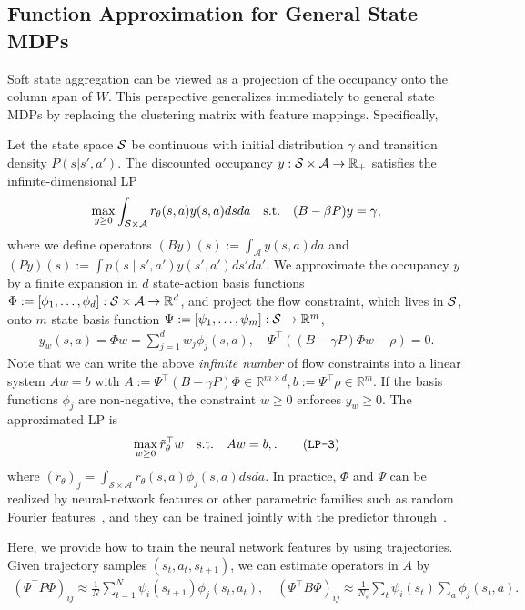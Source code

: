 \subsection{Function Approximation for General State MDPs}
Soft state aggregation can be viewed as a projection of the occupancy \LP onto the column span of $W$. This perspective generalizes immediately to general state MDPs by replacing the clustering matrix with feature mappings. Specifically, 

Let the state space ${\mathcal{S}}$ be continuous with initial distribution $\gamma$ and transition density $P(s | s', a')$. The discounted occupancy $y : {\mathcal{S}} \times {\mathcal{A}} \to \mathbb{R}_{+}$ satisfies the infinite-dimensional LP
\begin{align*}
    \max_{y \geq 0} \int_{{\mathcal{S}} \times {\mathcal{A}}} r_\theta(s, a) y(s, a) dsda
    \quad\text{s.t.}\quad
    (B - \beta P)y = \gamma, 
\end{align*}
where we define operators $(B y)(s) := \int_{\mathcal{A}} y(s, a) da$ and $(P y)(s) := \int p(s \mid s', a') y(s', a') ds' da'$. We approximate the occupancy $y$ by a finite expansion in $d$ state-action basis functions $\Phi := [\phi_1, \dots, \phi_d]: {\mathcal{S}} \times {\mathcal{A}} \to \mathbb{R}^d$, and project the flow constraint, which lives in ${\mathcal{S}}$, onto $m$ state basis function $\Psi := [\psi_1, \dots, \psi_m] : {\mathcal{S}} \to \mathbb{R}^m$,
\begin{align*}
    y_w(s,a) = \Phi w =  \sum_{j=1}^d w_j \phi_j(s,a), \quad \Psi^\top ((B - \gamma P)\Phi w - \rho) = 0.
\end{align*}
Note that we can write the above \emph{infinite number} of flow constraints into a linear system $Aw = b$ with
$A := \Psi^\top (B - \gamma P)\Phi \in \mathbb{R}^{m \times d},
b := \Psi^\top \rho \in \mathbb{R}^{m}$.
If the basis functions $\phi_j$ are non-negative, the constraint $w \geq 0$ enforces $y_w \geq 0$. The approximated LP is
\begin{align}
    \max_{w \geq 0}  \tilde{r}_\theta^\top w
    \quad\text{s.t.}\quad
    A w = b, .\tag{\texttt{LP-3}}
    \label{eq:projected_lp}
\end{align}
where $(\tilde{r}_\theta)_j = \int_{\mathcal{S}\times\mathcal{A}} r_\theta(s, a) \phi_j(s, a) ds da$. In practice, $\Phi$ and $\Psi$ can be realized by neural-network features or other parametric families such as random Fourier features~\cite{}, and they can be trained jointly with the predictor through~.

Here, we provide how to train the neural network features by using trajectories. Given trajectory samples $(s_t, a_t, s_{t+1})$, we can estimate operators in $A$ by
\begin{align*}
    (\Psi^\top P \Phi)_{ij} 
    \approx \frac{1}{N}\sum_{t=1}^N \psi_i(s_{t+1})\phi_j(s_t, a_t), \quad
    (\Psi^\top B \Phi)_{ij} \approx \frac{1}{N_s}\sum_t \psi_i(s_t)\sum_a \phi_j(s_t, a).
\end{align*}


